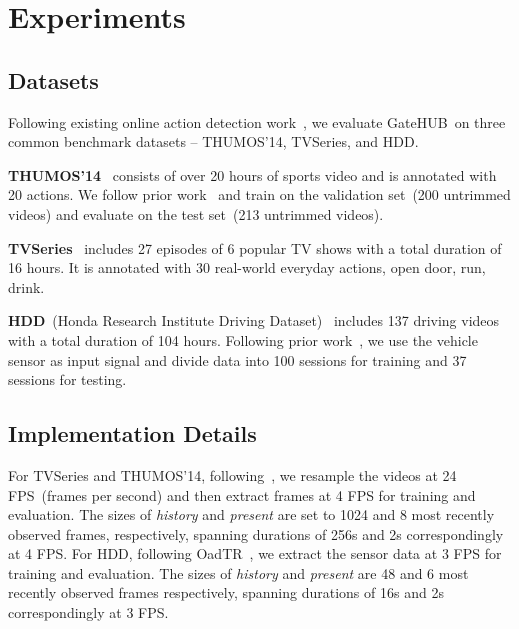 \documentclass[10pt,twocolumn,letterpaper]{article}
\newcommand{\methodname}{GateHUB}
\begin{document}
%
 \section{Experiments}


\subsection{Datasets}
Following existing online action detection work~\cite{wang2021oadtr, xu2019temporal, eun2020learning, gao2017red, xu2021long}, we evaluate \methodname~on three common benchmark datasets -- THUMOS'14, TVSeries, and HDD.

{\bf THUMOS’14}~\cite{THUMOS14} consists of over 20 hours of sports video and is annotated with 20 actions.
We follow prior work~\cite{wang2021oadtr, xu2019temporal} and train on the validation set~(200 untrimmed videos) and evaluate on the test set~(213 untrimmed videos). 

{\bf TVSeries}~\cite{de2016online} includes 27 episodes of 6 popular TV shows with a total duration of 16 hours. It is annotated with 30 real-world everyday actions, \eg open door, run, drink.


{\bf HDD}~(Honda Research Institute Driving Dataset)~\cite{RamanishkaCVPR2018} includes 137 driving videos with a total duration of 104 hours. Following prior work~\cite{wang2021oadtr}, we use the vehicle sensor as input signal and divide data into 100 sessions for training and 37 sessions for testing. 

\subsection{Implementation Details}
For TVSeries and THUMOS'14, following~\cite{wang2021oadtr, xu2019temporal, eun2020learning, gao2017red, xu2021long}, we resample the videos at 24 FPS~(frames per second) and then extract frames at 4 FPS for training and evaluation. The sizes of \textit{history} and \textit{present} are set to 1024 and 8 most recently observed frames, respectively, spanning durations of 256s and 2s correspondingly at 4 FPS.  
For HDD, following OadTR~\cite{wang2021oadtr}, we extract the sensor data at 3 FPS for training and evaluation. The sizes of \textit{history} and \textit{present} are 48 and 6 most recently observed frames respectively, spanning durations of 16s and 2s correspondingly at 3 FPS.
\end{document}
